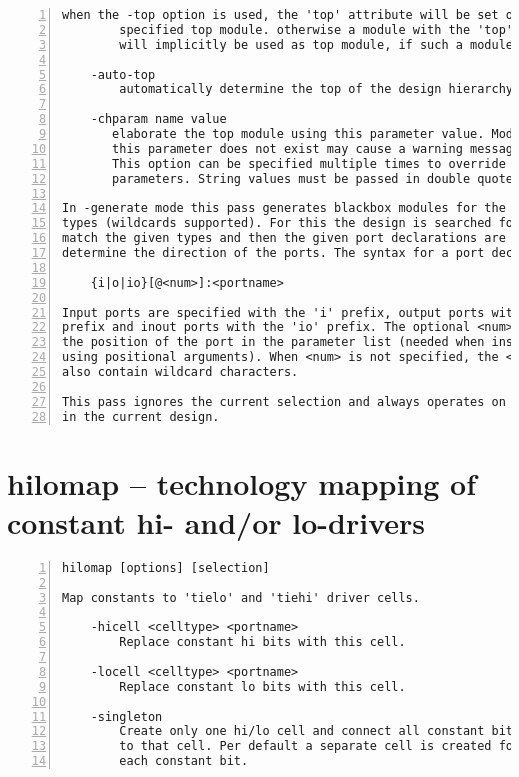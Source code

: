 \begin{lstlisting}[numbers=left,frame=single]
        when the -top option is used, the 'top' attribute will be set on the
        specified top module. otherwise a module with the 'top' attribute set
        will implicitly be used as top module, if such a module exists.

    -auto-top
        automatically determine the top of the design hierarchy and mark it.

    -chparam name value 
       elaborate the top module using this parameter value. Modules on which
       this parameter does not exist may cause a warning message to be output.
       This option can be specified multiple times to override multiple
       parameters. String values must be passed in double quotes (").

In -generate mode this pass generates blackbox modules for the given cell
types (wildcards supported). For this the design is searched for cells that
match the given types and then the given port declarations are used to
determine the direction of the ports. The syntax for a port declaration is:

    {i|o|io}[@<num>]:<portname>

Input ports are specified with the 'i' prefix, output ports with the 'o'
prefix and inout ports with the 'io' prefix. The optional <num> specifies
the position of the port in the parameter list (needed when instantiated
using positional arguments). When <num> is not specified, the <portname> can
also contain wildcard characters.

This pass ignores the current selection and always operates on all modules
in the current design.
\end{lstlisting}

\section{hilomap -- technology mapping of constant hi- and/or lo-drivers}
\label{cmd:hilomap}
\begin{lstlisting}[numbers=left,frame=single]
    hilomap [options] [selection]

Map constants to 'tielo' and 'tiehi' driver cells.

    -hicell <celltype> <portname>
        Replace constant hi bits with this cell.

    -locell <celltype> <portname>
        Replace constant lo bits with this cell.

    -singleton
        Create only one hi/lo cell and connect all constant bits
        to that cell. Per default a separate cell is created for
        each constant bit.
\end{lstlisting}

